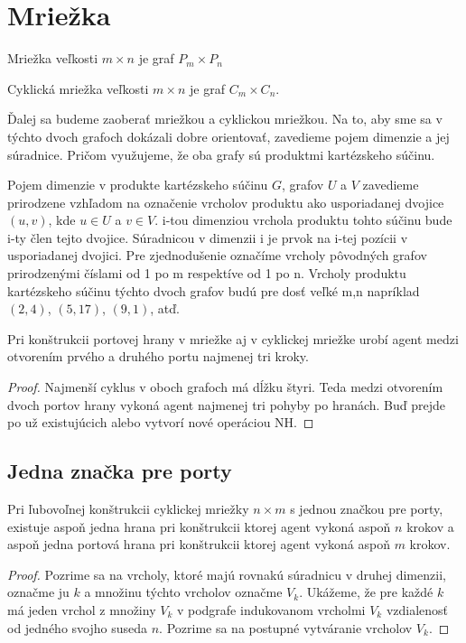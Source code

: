 \section{Mriežka}
\begin{defin}
Mriežka veľkosti $ m \times n$ je graf $P_{m} \times P_{n}$
\end{defin}
\begin{defin}
Cyklická mriežka veľkosti $m \times n$ je graf $C_{m} \times C_{n}$.
\end{defin}

Ďalej sa budeme zaoberať mriežkou a cyklickou mriežkou. Na to, aby sme sa v
týchto dvoch grafoch dokázali dobre orientovať, zavedieme pojem dimenzie a
jej súradnice. Pričom využujeme, že oba grafy sú produktmi kartézskeho
súčinu.
\begin{ozn}
Pojem dimenzie v produkte kartézskeho súčinu $G$, grafov $U$ a $V$ 
zavedieme prirodzene vzhľadom
na označenie vrcholov produktu ako usporiadanej dvojice $(u,v)$, kde $u \in
U$ a $v \in V$. i-tou dimenziou vrchola produktu tohto súčinu bude i-ty člen
tejto dvojice. Súradnicou v dimenzii i je prvok na i-tej pozícii v
usporiadanej dvojici. Pre zjednodušenie označíme vrcholy pôvodných grafov
prirodzenými číslami od 1 po m respektíve od 1 po n. Vrcholy produktu
kartézskeho súčinu týchto dvoch grafov budú pre dosť veľké m,n napríklad
$(2,4)$, $(5,17)$, $(9,1)$, atď.
\end{ozn}

\begin{lem}
Pri konštrukcii portovej hrany v mriežke aj v cyklickej mriežke urobí agent medzi otvorením prvého a druhého
portu najmenej tri kroky.
\end{lem}
\begin{proof}
Najmenší cyklus v oboch grafoch má dĺžku štyri. Teda medzi otvorením dvoch portov
hrany vykoná agent najmenej tri pohyby po hranách. Buď prejde po už
existujúcich alebo vytvorí nové operáciou NH.
\end{proof}

\subsection{Jedna značka pre porty}

\begin{lem}
Pri ľubovoľnej konštrukcii cyklickej mriežky $n \times m$ s jednou značkou
pre porty, existuje aspoň jedna hrana pri konštrukcii ktorej agent vykoná 
aspoň $n$ krokov
a aspoň jedna portová hrana pri konštrukcii ktorej agent vykoná aspoň $m$
krokov.
\end{lem}
\begin{proof}
Pozrime sa na vrcholy, ktoré majú rovnakú súradnicu v druhej dimenzii,
označme ju $k$ a množinu týchto vrcholov označme $V_{k}$. 
Ukážeme, že pre každé $k$ má jeden vrchol z množiny $V_{k}$ v
podgrafe indukovanom vrcholmi $V_{k}$ vzdialenosť od jedného svojho suseda $n$.
Pozrime sa na postupné vytváranie vrcholov $V_{k}$.
\end{proof}


